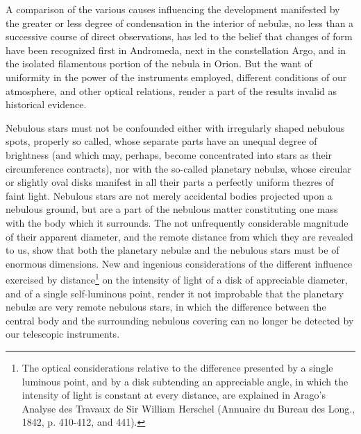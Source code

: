 A comparison of the various causes influencing the development manifested by the greater or less degree of condensation in the interior of nebul{\ae}, no less than a successive course of direct observations, has led to the belief that changes of form have been recognized first in Andromeda, next in the constellation Argo, and in the isolated filamentous portion of the nebula in Orion. But the want of uniformity in the power of the instruments employed, different conditions of our atmosphere, and other optical relations, render a part of the results invalid as historical evidence.

Nebulous stars must not be confounded either with irregularly shaped nebulous spots, properly so called, whose separate parts have an unequal degree of brightness (and which may, perhaps, become concentrated into stars as their circumference contracts), nor with the so-called planetary nebul{\ae}, whose circular or slightly oval disks manifest in all their parts a perfectly uniform thezres of faint light. Nebulous stars are not merely accidental bodies projected upon a nebulous ground, but are a part of the nebulous matter constituting one mass with the body which it surrounds. The not unfrequently considerable magnitude of their apparent diameter, and the remote distance from which they are revealed to us, show that both the planetary nebul{\ae} and the nebulous stars must be of enormous dimensions. New and ingenious considerations of the different influence exercised by distance\footnote{The optical considerations relative to the difference presented by a single luminous point, and by a disk subtending an appreciable angle, in which the intensity of light is constant at every distance, are explained in Arago's Analyse des Travaux de Sir William Herschel (Annuaire du Bureau des Long., 1842, p. 410-412, and 441).} on the intensity of light of a disk of appreciable diameter, and of a single self-luminous point, render it not improbable that the planetary nebul{\ae} are very remote nebulous stars, in which the difference between the central body and the surrounding nebulous covering can no longer be detected by our telescopic instruments.

